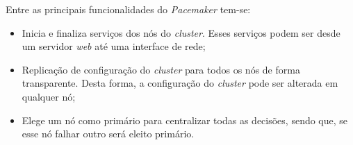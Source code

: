 Entre as principais funcionalidades do \textit{Pacemaker} tem-se:
\begin{itemize}
 \item Inicia e finaliza serviços dos nós do \textit{cluster}. Esses serviços podem ser desde um servidor \textit{web} até uma interface de 
 rede;
 \item Replicação de configuração do \textit{cluster} para todos os nós de forma transparente. Desta forma, a configuração do \textit{cluster} 
 pode ser alterada em qualquer nó;
 \item Elege um nó como primário para centralizar todas as decisões, sendo que, se esse nó falhar outro será eleito primário.
\end{itemize}

% 

